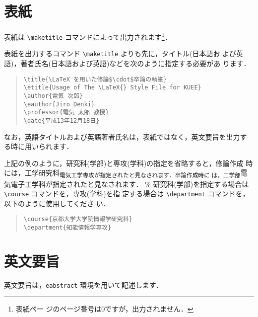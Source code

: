 \documentclass[
  sotsuron]{kuee}
\begin{document}
\hypertarget{ux8868ux7d19}{%
\section{表紙}\label{ux8868ux7d19}}

表紙は \verb+\maketitle+ コマンドによって出力されます\footnote{表紙ペー
  ジのページ番号は0ですが，出力されません．}．

表紙を出力するコマンド \verb+\maketitle+ よりも先に，タイトル(日本語お
よび英語)，著者氏名(日本語および英語)などを次のように指定する必要があ
ります．

\begin{quote}
  \begin{verbatim}
\title{\LaTeX を用いた修論$\cdot$卒論の執筆}
\etitle{Usage of The \LaTeX{} Style File for KUEE}
\author{電気 次郎}
\eauthor{Jiro Denki}
\professor{電気 太郎 教授}
\date{平成13年12月18日}
\end{verbatim}
\end{quote}

なお，英語タイトルおよび英語著者氏名は，表紙ではなく，英文要旨を出力す
る時に用いられます．

上記の例のように，研究科(学部)と専攻(学科)の指定を省略すると，修論作成
時には，工学研究科\textsubscript{電気工学専攻が指定されたと見なされます．卒論作成時に
は，工学部}電気電子工学科が指定されたと見なされます． \%
研究科(学部)を指定する場合は \verb+\course+ コマンドを，専攻(学科)を指
定する場合は \verb+\department+ コマンドを，以下のように使用してくださ
い．

\begin{quote}
  \begin{verbatim}
\course{京都大学大学院情報学研究科}
\department{知能情報学専攻}
\end{verbatim}
\end{quote}

\hypertarget{ux82f1ux6587ux8981ux65e8}{%
\section{英文要旨}\label{ux82f1ux6587ux8981ux65e8}}

英文要旨は，\verb+eabstract+ 環境を用いて記述します．
\end{document}
